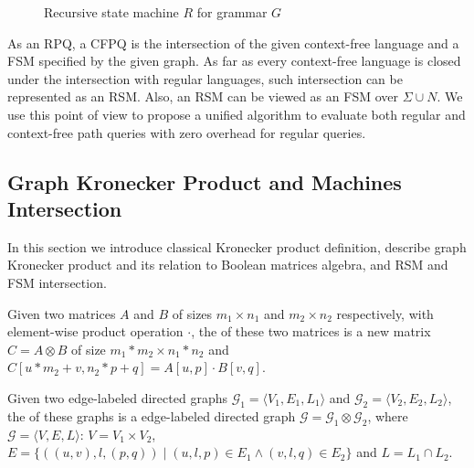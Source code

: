 \begin{figure}[h]
    \centering
    \caption{Recursive state machine $R$ for grammar $G$}
    \label{example:automata}
\end{figure}


As an RPQ, a CFPQ is the intersection of the given context-free language and a FSM specified by the given graph.
As far as every context-free language is closed under the intersection with regular languages, such intersection can be represented as an RSM.
Also, an RSM can be viewed as an FSM over $\Sigma \cup N$.
We use this point of view to propose a unified algorithm to evaluate both regular and context-free path queries with zero overhead for regular queries.

\subsection{Graph Kronecker Product and Machines Intersection}

In this section we introduce classical Kronecker product definition,
describe graph Kronecker product and its relation to Boolean matrices algebra,
and RSM and FSM intersection.

\begin{definition}
Given two matrices $A$ and $B$ of sizes $m_1 \times n_1$ and $m_2 \times n_2$
respectively, with element-wise product operation $\cdot$, the  of these two matrices is a new matrix $C = A \otimes B$ of size $m_1 * m_2 \times n_1 * n_2$ and $C[u * m_2 + v,n_2 * p + q] = A[u,p] \cdot B[v,q]$.
\end{definition}

\begin{definition}
\label{def:graph:product}
Given two edge-labeled directed graphs $\mathcal{G}_1=\langle V_1, E_1, L_1 \rangle$
and $\mathcal{G}_2=\langle V_2, E_2, L_2 \rangle$,
the  of these graphs is a edge-labeled directed graph
$\mathcal{G}=\mathcal{G}_1 \otimes \mathcal{G}_2$,
where $\mathcal{G}= \langle V, E, L \rangle$:  $V = V_1 \times V_2$, $E = \{((u,v),l,(p,q)) \mid (u,l,p) \in E_1 \wedge (v,l,q) \in E_2 \}$ and $L = L_1 \cap L_2$.
\end{definition}

